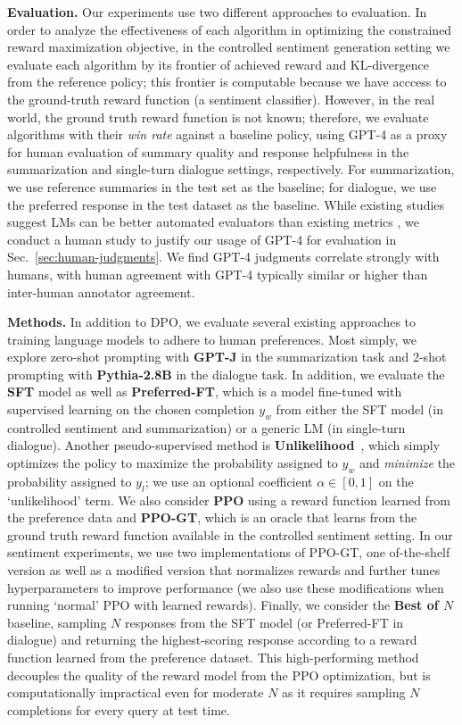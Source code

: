 \textbf{Evaluation.} Our experiments use two different approaches to evaluation. In order to analyze the effectiveness of each algorithm in optimizing the constrained reward maximization objective, in the controlled sentiment generation setting we evaluate each algorithm by its frontier of achieved reward and KL-divergence from the reference policy; this frontier is computable because we have acccess to the ground-truth reward function (a sentiment classifier). However, in the real world, the ground truth reward function is not known; therefore, we evaluate algorithms with their \textit{win rate} against a baseline policy, using GPT-4 as a proxy for human evaluation of summary quality and response helpfulness in the summarization and single-turn dialogue settings, respectively. For summarization, we use reference summaries in the test set as the baseline; for dialogue, we use the preferred response in the test dataset as the baseline. While existing studies suggest LMs can be better automated evaluators than existing metrics \citep{Chen2023ExploringTU}, we conduct a human study to justify our usage of GPT-4 for evaluation in Sec.~\ref{sec:human-judgments}. We find GPT-4 judgments correlate strongly with humans, with human agreement with GPT-4 typically similar or higher than inter-human annotator agreement. 

\textbf{Methods.} In addition to DPO, we evaluate several existing approaches to training language models to adhere to human preferences. Most simply, we explore zero-shot prompting with \textbf{GPT-J} \citep{gpt-j} in the summarization task and 2-shot prompting with \textbf{Pythia-2.8B} \citep{biderman2023pythia} in the dialogue task. In addition, we evaluate the \textbf{SFT} model as well as \textbf{Preferred-FT}, which is a model fine-tuned with supervised learning on the chosen completion $y_w$ from either the SFT model (in controlled sentiment and summarization) or a generic LM (in single-turn dialogue). Another pseudo-supervised method is \textbf{Unlikelihood}~\citep{welleck2019neural}, which simply optimizes the policy to maximize the probability assigned to $y_w$ and \textit{minimize} the probability assigned to $y_l$; we use an optional coefficient $\alpha\in[0,1]$ on the `unlikelihood' term. We also consider \textbf{PPO} \citep{schulman2017proximal} using a reward function learned from the preference data and \textbf{PPO-GT}, which is an oracle that learns from the ground truth reward function available in the controlled sentiment setting. In our sentiment experiments, we use two implementations of PPO-GT, one of-the-shelf version \cite{leandro_von_werra_2023_7790115} as well as a modified version that normalizes rewards and further tunes hyperparameters to improve performance (we also use these modifications when running `normal' PPO with learned rewards). Finally, we consider the \textbf{Best of $N$} baseline, sampling $N$ responses from the SFT model (or Preferred-FT in dialogue) and returning the highest-scoring response according to a reward function learned from the preference dataset. This high-performing method decouples the quality of the reward model from the PPO optimization, but is computationally impractical even for moderate $N$ as it requires sampling $N$ completions for every query at test time.

